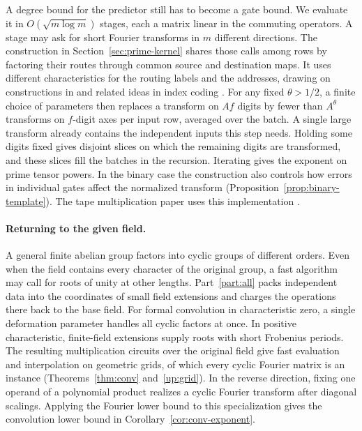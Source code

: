A degree bound for the predictor still has to become a gate bound.
We evaluate it in $O(\sqrt{m\log m})$ stages, each a matrix linear
in the commuting operators. A stage may ask for short Fourier
transforms in $m$ different directions. The construction in
Section~\ref{sec:prime-kernel} shares those calls among rows by
factoring their routes through common source and destination maps.
It uses different characteristics for the routing labels and the
addresses, drawing on constructions in \cite{Tape,FranklWilson1981,Alon1998}
and related ideas in index coding \cite{BarYossefBirkJayramKol2006,LubetzkyStav2009}.
For any fixed $\theta>1/2$, a finite choice of parameters then
replaces a transform on $Af$ digits by fewer than $A^\theta$
transforms on $f$-digit axes per input row, averaged over the batch.
A single large transform already contains the independent inputs this
step needs. Holding some digits fixed gives disjoint slices on which
the remaining digits are transformed, and these slices fill the batches
in the recursion. Iterating gives the exponent on prime tensor powers.
In the binary
case the construction also controls how errors in individual gates
affect the normalized transform (Proposition~\ref{prop:binary-template}).
The tape multiplication paper uses this implementation \cite{oaT}.

\paragraph{Returning to the given field.}
A general finite abelian group factors into cyclic groups of different
orders. Even when the field contains every character of the original
group, a fast algorithm may call for roots of unity at other lengths.
Part~\ref{part:all} packs independent data into the coordinates of
small field extensions and charges the operations there back to the
base field. For formal convolution in characteristic zero, a single
deformation parameter handles all cyclic factors at once. In positive
characteristic, finite-field extensions supply roots with short
Frobenius periods. The resulting multiplication circuits over the
original field give fast evaluation and interpolation on geometric
grids, of which every cyclic Fourier matrix is an instance
(Theorems~\ref{thm:conv} and~\ref{up:grid}).
In the reverse direction, fixing one operand of a polynomial product
realizes a cyclic Fourier transform after diagonal scalings. Applying
the Fourier lower bound to this specialization gives the convolution
lower bound in Corollary~\ref{cor:conv-exponent}.
